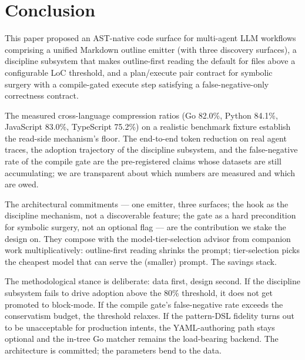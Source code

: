 \section{Conclusion}
\label{sec:conclusion}

This paper proposed an AST-native code surface for multi-agent LLM
workflows comprising a unified Markdown outline emitter (with three
discovery surfaces), a discipline subsystem that makes outline-first
reading the default for files above a configurable LoC threshold,
and a plan/execute pair contract for symbolic surgery with a
compile-gated execute step satisfying a false-negative-only
correctness contract.

The measured cross-language compression ratios (Go 82.0\%, Python
84.1\%, JavaScript 83.0\%, TypeScript 75.2\%) on a realistic
benchmark fixture establish the read-side mechanism's floor. The
end-to-end token reduction on real agent traces, the adoption
trajectory of the discipline subsystem, and the false-negative rate
of the compile gate are the pre-registered claims whose datasets
are still accumulating; we are transparent about which numbers are
measured and which are owed.

The architectural commitments --- one emitter, three surfaces; the
hook as the discipline mechanism, not a discoverable feature; the
gate as a hard precondition for symbolic surgery, not an optional
flag --- are the contribution we stake the design on. They compose
with the model-tier-selection advisor from companion work
\cite{blackrim_moa_paper} multiplicatively: outline-first reading
shrinks the prompt; tier-selection picks the cheapest model that
can serve the (smaller) prompt. The savings stack.

The methodological stance is deliberate: data first, design
second. If the discipline subsystem fails to drive adoption above
the 80\% threshold, it does not get promoted to block-mode. If the
compile gate's false-negative rate exceeds the conservatism budget,
the threshold relaxes. If the pattern-DSL fidelity turns out to be
unacceptable for production intents, the YAML-authoring path stays
optional and the in-tree Go matcher remains the load-bearing
backend. The architecture is committed; the parameters bend to the
data.
